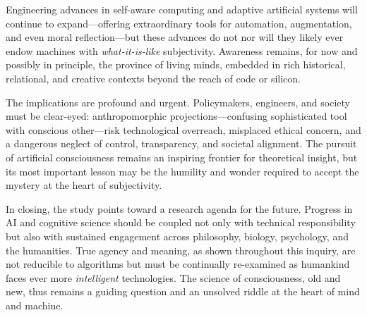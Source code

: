 Engineering advances in self-aware computing and adaptive artificial systems will continue to expand---offering extraordinary tools for automation, augmentation, and even moral reflection---but these advances do not nor will they likely ever endow machines with \emph{what-it-is-like} subjectivity. Awareness remains, for now and possibly in principle, the province of living minds, embedded in rich historical, relational, and creative contexts beyond the reach of code or silicon.

The implications are profound and urgent. Policymakers, engineers, and society must be clear-eyed: anthropomorphic projections---confusing sophisticated tool with conscious other---risk technological overreach, misplaced ethical concern, and a dangerous neglect of control, transparency, and societal alignment. The pursuit of artificial consciousness remains an inspiring frontier for theoretical insight, but its most important lesson may be the humility and wonder required to accept the mystery at the heart of subjectivity.

In closing, the study points toward a research agenda for the future. Progress in AI and cognitive science should be coupled not only with technical responsibility but also with sustained engagement across philosophy, biology, psychology, and the humanities. True agency and meaning, as shown throughout this inquiry, are not reducible to algorithms but must be continually re-examined as humankind faces ever more \emph{intelligent} technologies. The science of consciousness, old and new, thus remains a guiding question and an unsolved riddle at the heart of mind and machine.